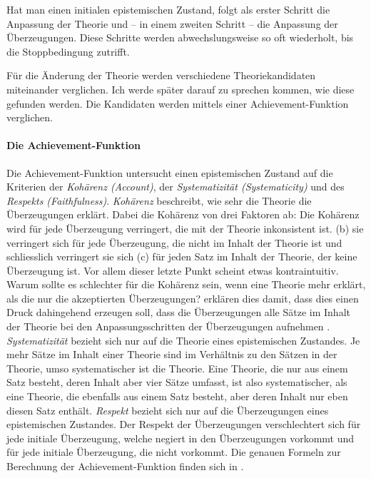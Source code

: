 \documentclass{article}
\begin{document}
Hat man einen initialen epistemischen Zustand, folgt als erster Schritt die Anpassung der Theorie und -- in einem zweiten Schritt -- die Anpassung der Überzeugungen. Diese Schritte werden abwechslungsweise so oft wiederholt, bis die Stoppbedingung zutrifft. \parencite[vgl.][S.~449]{beisbart_making_2021}

Für die Änderung der Theorie werden verschiedene Theoriekandidaten miteinander verglichen. Ich werde später darauf zu sprechen kommen, wie diese gefunden werden. Die Kandidaten werden mittels einer Achievement-Funktion verglichen.

\paragraph{Die Achievement-Funktion} \label{achievement-funktion}
Die Achievement-Funktion untersucht einen epistemischen Zustand auf die Kriterien der \textit{Kohärenz (Account)}, der \textit{Systematizität (Systematicity)} und des \textit{Respekts (Faithfulness)}. \textit{Kohärenz} beschreibt, wie sehr die Theorie die Überzeugungen erklärt. Dabei die Kohärenz von drei Faktoren ab: Die Kohärenz wird für jede Überzeugung verringert, die mit der Theorie inkonsistent ist. (b) sie verringert sich für jede Überzeugung, die nicht im Inhalt der Theorie ist und schliesslich verringert sie sich (c) für jeden Satz im Inhalt der Theorie, der keine Überzeugung ist. Vor allem dieser letzte Punkt scheint etwas kontraintuitiv. Warum sollte es schlechter für die Kohärenz sein, wenn eine Theorie mehr erklärt, als die nur die akzeptierten Überzeugungen? \citeauthor{beisbart_making_2021} erklären dies damit, dass dies einen Druck dahingehend erzeugen soll, dass die Überzeugungen alle Sätze im Inhalt der Theorie bei den Anpassungsschritten der Überzeugungen aufnehmen \parencite[vgl.][S.~448]{beisbart_making_2021}.
\textit{Systematizität} bezieht sich nur auf die Theorie eines epistemischen Zustandes. Je mehr Sätze im Inhalt einer Theorie sind im Verhältnis zu den Sätzen in der Theorie, umso systematischer ist die Theorie. Eine Theorie, die nur aus einem Satz besteht, deren Inhalt aber vier Sätze umfasst, ist also systematischer, als eine Theorie, die ebenfalls aus einem Satz besteht, aber deren Inhalt nur eben diesen Satz enthält.
\textit{Respekt} bezieht sich nur auf die Überzeugungen eines epistemischen Zustandes. Der Respekt der Überzeugungen verschlechtert sich für jede initiale Überzeugung, welche negiert in den Überzeugungen vorkommt und für jede initiale Überzeugung, die nicht vorkommt.
Die genauen Formeln zur Berechnung der Achievement-Funktion finden sich in \cite[S.~464~ff.]{beisbart_making_2021}.
\end{document}
